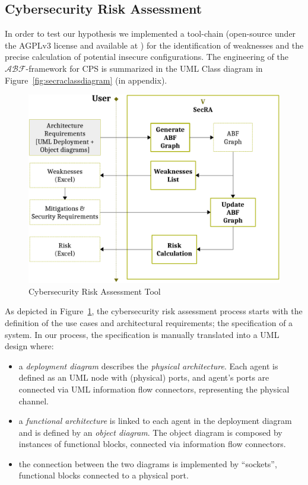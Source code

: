 \documentclass[conference]{IEEEtran}
\newcommand{\assertionRegion}{\mathcal{A}}
\newcommand{\beliefRegion}{\mathcal{B}}
\newcommand{\factRegion}{\mathcal{F}}
\newcommand{\abftheory}{\assertionRegion\beliefRegion\factRegion}
\begin{document}
\subsection{Cybersecurity Risk Assessment}\label{sec:secra}
In order to test our hypothesis we implemented a tool-chain (open-source under the
AGPLv3 license and available at \autocite{v-research2020cybersecurity-anonymous}) for the
identification of weaknesses and the precise calculation of potential insecure
configurations. The engineering of the $\abftheory$-framework for CPS is summarized in the UML
Class diagram in Figure~\ref{fig:secraclassdiagram} (in appendix). 

\begin{figure}
	\centering
	\includegraphics[width=.9\columnwidth]{v-secra.pdf}
	\caption{Cybersecurity Risk Assessment Tool}
	\label{fig:secra}
\end{figure}
As depicted in Figure~\ref{fig:secra}, the cybersecurity risk assessment process
starts with the definition of the use cases and architectural requirements; the
specification of a system.  In our process, the specification is manually
translated into a UML design where:
\begin{itemize}
	\item a \emph{deployment diagram} describes the \emph{physical
		architecture}. Each agent is defined as an UML node with (physical)
		ports, and agent's ports are connected via UML information flow
		connectors, representing the physical channel.
	\item a \emph{functional architecture} is linked to each agent in the
		deployment diagram and is defined by an \emph{object diagram}.
		The object diagram is composed by instances of functional
		blocks, connected via information flow connectors.
	\item the connection between the two diagrams is implemented by
		``sockets'', functional blocks connected to a 
		physical port.
\end{itemize}
\end{document}
